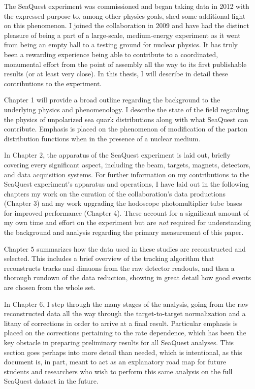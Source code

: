 \documentclass[edeposit,fullpage]{uiucthesis2009}
\begin{document}
The SeaQuest experiment was commissioned and began taking data in 2012 with the expressed purpose to, among other physics goals, shed some additional light on this phenomenon. I joined the collaboration in 2009 and have had the distinct pleasure of being a part of a large-scale, medium-energy experiment as it went from being an empty hall to a testing ground for nuclear physics. It has truly been a rewarding experience being able to contribute to a coordinated, monumental effort from the point of assembly all the way to its first publishable results (or at least very close). In this thesis, I will describe in detail these contributions to the experiment. 

Chapter 1 will provide a broad outline regarding the background to the underlying physics and phenomenology. I describe the state of the field regarding the physics of unpolarized sea quark distributions along with what SeaQuest can contribute. Emphasis is placed on the phenomenon of modification of the parton distribution functions when in the presence of a nuclear medium.

In Chapter 2, the apparatus of the SeaQuest experiment is laid out, briefly covering every significant aspect, including the beam, targets, magnets, detectors, and data acquisition systems. For further information on my contributions to the SeaQuest experiment's apparatus and operations, I have laid out in the following chapters my work on the curation of the collaboration's data productions (Chapter 3) and my work upgrading the hodoscope photomultiplier tube bases for improved performance (Chapter 4). These account for a significant amount of my own time and effort on the experiment but are \emph{not} required for understanding the background and analysis regarding the primary measurement of this paper.

Chapter 5 summarizes how the data used in these studies are reconstructed and selected. This includes a brief overview of the tracking algorithm that reconstructs tracks and dimuons from the raw detector readouts, and then a thorough rundown of the data reduction, showing in great detail how good events are chosen from the whole set.

In Chapter 6, I step through the many stages of the analysis, going from the raw reconstructed data all the way through the target-to-target normalization and a litany of corrections in order to arrive at a final result. Particular emphasis is placed on the corrections pertaining to the rate dependence, which has been the key obstacle in preparing preliminary results for all SeaQuest analyses. This section goes perhaps into more detail than needed, which is intentional, as this document is, in part, meant to act as an explanatory road map for future students and researchers who wish to perform this same analysis on the full SeaQuest dataset in the future.
\end{document}
